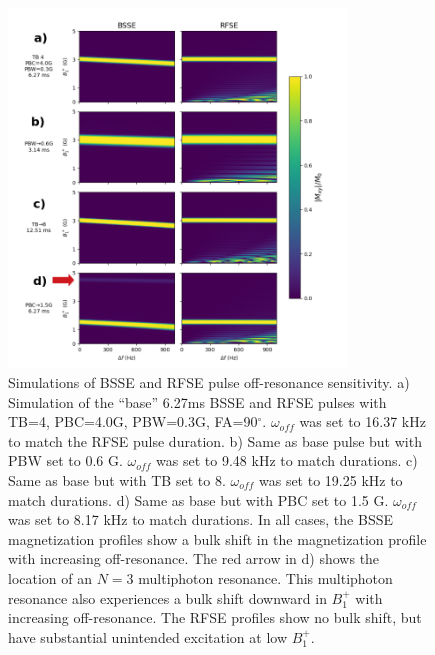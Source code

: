 \begin{figure}[h]
\centering
\includegraphics[width=0.8\textwidth]{figures/offres_processed.png}
\caption{Simulations of BSSE and RFSE pulse off-resonance sensitivity. 
a) Simulation of the ``base'' 6.27ms BSSE and RFSE pulses with TB=4, PBC=4.0G, PBW=0.3G, FA=90$^\circ$. 
$\omega_{off}$ was set to  16.37 kHz to match the RFSE pulse duration. 
b) Same as base pulse but with PBW set to 0.6 G. 
$\omega_{off}$ was set to 9.48 kHz to match durations. 
c) Same as base but with TB set to 8. 
$\omega_{off}$ was set to 19.25 kHz to match durations. 
d) Same as base but with PBC set to 1.5 G. 
$\omega_{off}$ was set to 8.17 kHz to match durations.
In all cases, the BSSE magnetization profiles show a bulk shift in the magnetization profile with increasing off-resonance. 
The red arrow in d) shows the location of an $N=3$ multiphoton resonance. 
This multiphoton resonance also experiences a bulk shift downward in $B_1^+$ with increasing off-resonance. 
The RFSE profiles show no bulk shift, but have substantial unintended excitation at low $B_1^+$.}
\label{fig:offres}
\end{figure}

